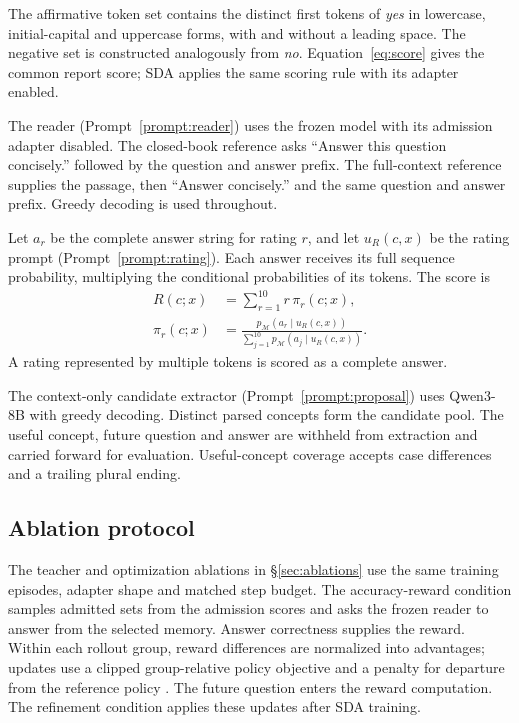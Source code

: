 The affirmative token set contains the distinct first tokens of
\emph{yes} in lowercase, initial-capital and uppercase forms, with
and without a leading space. The negative set is constructed analogously
from \emph{no}. Equation~\eqref{eq:score} gives the common report
score; SDA applies the same scoring rule with its adapter enabled.

The reader (Prompt~\ref{prompt:reader}) uses the frozen model with its
admission adapter disabled.
The closed-book reference asks ``Answer this question concisely.''
followed by the question and answer prefix. The full-context reference
supplies the passage, then ``Answer concisely.'' and the same question
and answer prefix. Greedy decoding is used throughout.

Let $a_r$ be the complete answer string for rating $r$, and let $u_R(c,x)$
be the rating prompt (Prompt~\ref{prompt:rating}). Each answer receives
its full sequence probability, multiplying the conditional probabilities
of its tokens. The score is
\begin{equation}
\begin{split}
R(c;x)&=\sum_{r=1}^{10}r\,\pi_r(c;x),\\
\pi_r(c;x)&=\frac{p_{\mathcal M}(a_r\mid u_R(c,x))}
{\sum_{j=1}^{10}p_{\mathcal M}(a_j\mid u_R(c,x))}.
\end{split}
\label{eq:rating}
\end{equation}
A rating represented by multiple tokens is scored as a complete answer.

The context-only candidate extractor (Prompt~\ref{prompt:proposal}) uses
Qwen3-8B with greedy decoding. Distinct parsed concepts form the
candidate pool. The useful concept, future question and answer are
withheld from extraction and carried forward for evaluation.
Useful-concept coverage accepts case differences and a trailing plural
ending.

\subsection{Ablation protocol}
\label{app:ablationprotocol}

The teacher and optimization ablations in \S\ref{sec:ablations} use the
same training episodes, adapter shape and matched step budget. The
accuracy-reward condition samples admitted sets from the admission
scores and asks the frozen reader to answer from the selected memory.
Answer correctness supplies the reward. Within each rollout group,
reward differences are normalized into advantages; updates use a
clipped group-relative policy objective and a penalty for departure
from the reference policy \citep{shao2024deepseekmath}. The future
question enters the reward computation. The refinement condition
applies these updates after SDA training.
